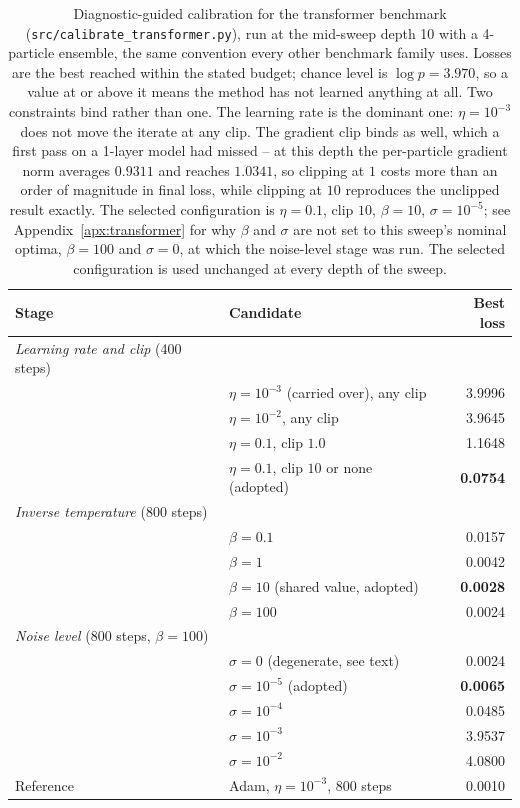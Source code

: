 \documentclass{article}
\theoremstyle{plain}
\theoremstyle{definition}
\theoremstyle{remark}
\begin{document}
\begin{table}[!htbp]
\centering
\caption{Diagnostic-guided calibration for the transformer benchmark
(\texttt{src/calibrate\_transformer.py}), run at the mid-sweep depth 10 with a 4-particle ensemble,
the same convention every other benchmark family uses. Losses are the best reached within the
stated budget; chance level is $\log p=3.970$, so a value at or above it means the method has not
learned anything at all. Two constraints bind rather than one. The learning rate is the dominant
one: $\eta=10^{-3}$ does not move the iterate at any clip. The gradient clip binds as well, which a
first pass on a 1-layer model had missed -- at this depth the per-particle gradient norm averages
$0.9311$ and reaches $1.0341$, so clipping at $1$ costs more than an order of magnitude in final
loss, while clipping at $10$ reproduces the unclipped result exactly. The selected configuration is
$\eta=0.1$, clip $10$, $\beta=10$, $\sigma=10^{-5}$; see Appendix~\ref{apx:transformer} for why $\beta$
and $\sigma$ are not set to this sweep's nominal optima, $\beta=100$ and $\sigma=0$, at which the
noise-level stage was run. The selected configuration is used unchanged at every depth of the sweep.}
\label{tab:transformer_calibration}
\begin{tabular}{@{}llr@{}}
\toprule
\textbf{Stage} & \textbf{Candidate} & \textbf{Best loss} \\
\midrule
\emph{Learning rate and clip} (400 steps) & & \\
  & $\eta=10^{-3}$ (carried over), any clip & 3.9996 \\
  & $\eta=10^{-2}$, any clip                & 3.9645 \\
  & $\eta=0.1$, clip $1.0$                  & 1.1648 \\
  & $\eta=0.1$, clip $10$ or none (adopted) & \textbf{0.0754} \\
\midrule
\emph{Inverse temperature} (800 steps) & & \\
  & $\beta=0.1$   & 0.0157 \\
  & $\beta=1$     & 0.0042 \\
  & $\beta=10$ (shared value, adopted) & \textbf{0.0028} \\
  & $\beta=100$   & 0.0024 \\
\midrule
\emph{Noise level} (800 steps, $\beta=100$) & & \\
  & $\sigma=0$ (degenerate, see text) & 0.0024 \\
  & $\sigma=10^{-5}$ (adopted)        & \textbf{0.0065} \\
  & $\sigma=10^{-4}$                  & 0.0485 \\
  & $\sigma=10^{-3}$                  & 3.9537 \\
  & $\sigma=10^{-2}$                  & 4.0800 \\
\midrule
Reference & Adam, $\eta=10^{-3}$, 800 steps & 0.0010 \\
\bottomrule
\end{tabular}
\end{table}
\end{document}
